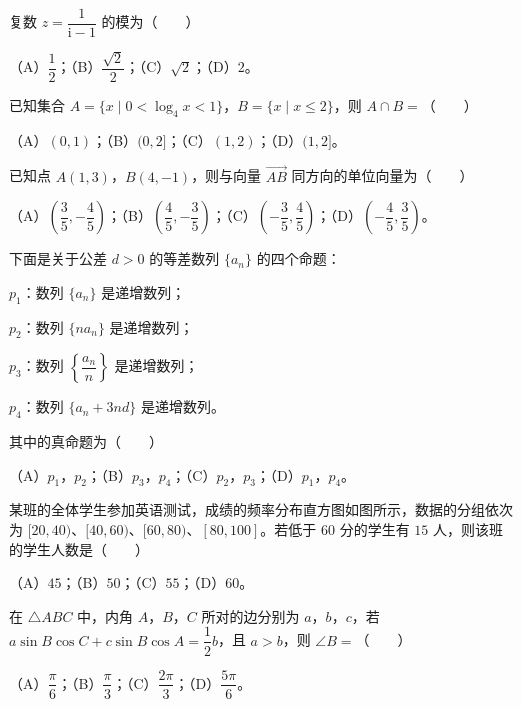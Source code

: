 \begin{question}
复数 $z=\dfrac{1}{\mathrm i-1}$ 的模为\mbox{（　　）}

（A）$\dfrac12$；（B）$\dfrac{\sqrt2}2$；（C）$\sqrt2$；（D）$2$。

\end{question}
\begin{question}
已知集合 $A=\{x\mid 0<\log_4x<1\}$，$B=\{x\mid x\leqslant2\}$，则 $A\cap B=$\mbox{（　　）}

（A）$(0,1)$；（B）$(0,2]$；（C）$(1,2)$；（D）$(1,2]$。

\end{question}
\begin{question}
已知点 $A(1,3)$，$B(4,-1)$，则与向量 $\overrightarrow{AB}$ 同方向的单位向量为\mbox{（　　）}

（A）$\left(\dfrac35,-\dfrac45\right)$；（B）$\left(\dfrac45,-\dfrac35\right)$；（C）$\left(-\dfrac35,\dfrac45\right)$；（D）$\left(-\dfrac45,\dfrac35\right)$。

\end{question}
\begin{question}
下面是关于公差 $d>0$ 的等差数列 $\{a_n\}$ 的四个命题：

$p_1$：数列 $\{a_n\}$ 是递增数列；

$p_2$：数列 $\{na_n\}$ 是递增数列；

$p_3$：数列 $\left\{\dfrac{a_n}{n}\right\}$ 是递增数列；

$p_4$：数列 $\{a_n+3nd\}$ 是递增数列。

其中的真命题为\mbox{（　　）}

（A）$p_1$，$p_2$；（B）$p_3$，$p_4$；（C）$p_2$，$p_3$；（D）$p_1$，$p_4$。

\Needspace{0.4\textheight}
\end{question}
\begin{question}
某班的全体学生参加英语测试，成绩的频率分布直方图如图所示，数据的分组依次为 $[20,40)$、$[40,60)$、$[60,80)$、$[80,100]$。若低于 $60$ 分的学生有 $15$ 人，则该班的学生人数是\mbox{（　　）}
\nopagebreak[4]
\begin{center}\end{center}
\nopagebreak[4]
（A）$45$；（B）$50$；（C）$55$；（D）$60$。

\end{question}
\begin{question}
在 $\triangle ABC$ 中，内角 $A$，$B$，$C$ 所对的边分别为 $a$，$b$，$c$，若 $a\sin B\cos C+c\sin B\cos A=\dfrac12b$，且 $a>b$，则 $\angle B=$\mbox{（　　）}

（A）$\dfrac{\pi}6$；（B）$\dfrac{\pi}3$；（C）$\dfrac{2\pi}3$；（D）$\dfrac{5\pi}6$。

\end{question}
